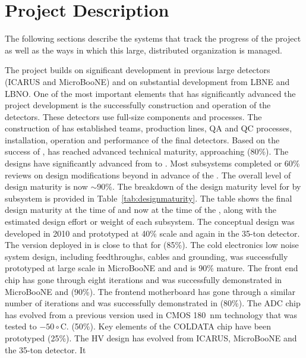 \section{ Project Description}

The following sections describe the systems that track the progress of
the  project as well as the ways in which this large,
distributed organization is managed.

The  project builds on significant development in previous
large  detectors (ICARUS and MicroBooNE) and on
substantial development from LBNE and LBNO. One of the most important
elements that has significantly advanced the project development is
the successfully construction and operation of the 
detectors. These detectors use full-size  components and
processes. The construction of  has established
teams, production lines, QA and QC processes, installation, operation
and performance of the final  detectors. Based on the
success of ,  has reached advanced technical
maturity, approaching (80\%). The designs have significantly advanced
from  to . Most subsystems completed
 or 60\% reviews on design modifications beyond
 in advance of the . The overall level of
design maturity is now $\sim$90\%. The breakdown of the design maturity
level for  by subsystem is provided in
Table~\ref{tab:designmaturity}. The table shows the final 
design maturity at the time of  and now at the time
of the , along with the estimated design effort or weight
of each subsystem. The  conceptual design was developed in
2010 and prototyped at 40\% scale and again in the 35-ton detector. The version
deployed in  is close to that for  (85\%). The
cold electronics low noise system design, including feedthroughs,
cables and grounding, was successfully prototyped at large scale in
MicroBooNE and  and is 90\% mature. The front end chip has
gone through eight iterations and was successfully demonstrated in
MicroBooNE and  (90\%). The frontend motherboard has gone
through a similar number of iterations and was successfully
demonstrated in  (80\%). The ADC chip has evolved from a
previous version used in CMOS 180~nm technology that was tested to $-50\circ$C. (50\%). Key
elements of the COLDATA chip have been prototyped (25\%). The HV
design has evolved from ICARUS, MicroBooNE and the 35-ton detector.  It
